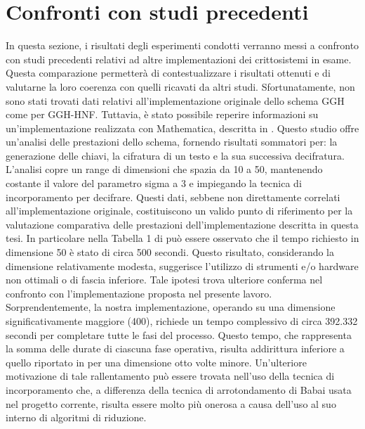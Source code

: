 \section{Confronti con studi precedenti}

In questa sezione, i risultati degli esperimenti condotti verranno messi a confronto 
con studi precedenti relativi ad altre implementazioni dei crittosistemi in esame. 
Questa comparazione permetterà di 
contestualizzare i risultati ottenuti e di valutarne la loro coerenza con quelli ricavati
da altri studi. 
Sfortunatamente, non sono stati trovati dati relativi all'implementazione originale dello schema 
GGH come per GGH-HNF. Tuttavia, è stato possibile reperire informazioni su un'implementazione realizzata 
con Mathematica, descritta in \cite{GGH16}. Questo studio offre un'analisi delle prestazioni 
dello schema, fornendo risultati sommatori per: la generazione delle chiavi, la cifratura 
di un testo e la sua successiva decifratura. L'analisi copre un range di dimensioni che 
spazia da 10 a 50, mantenendo costante il valore del parametro sigma a 3 e 
impiegando la tecnica di incorporamento per decifrare. Questi dati, sebbene non direttamente correlati 
all'implementazione originale, costituiscono un valido punto di riferimento per la valutazione 
comparativa delle prestazioni dell'implementazione descritta in questa tesi. In particolare 
nella Tabella 1 di \cite[Sezione 6]{GGH16} può essere osservato che il tempo richiesto 
in dimensione 50 è stato di circa 500 secondi. 
Questo risultato, considerando la dimensione relativamente modesta, suggerisce l'utilizzo 
di strumenti e/o hardware non ottimali o di fascia inferiore. Tale ipotesi trova ulteriore conferma nel confronto con l'implementazione 
proposta nel presente lavoro. Sorprendentemente, la nostra implementazione, operando su 
una dimensione significativamente maggiore (400), richiede un tempo complessivo di circa 
392.332 secondi per completare tutte le fasi del processo. Questo tempo, che rappresenta 
la somma delle durate di ciascuna fase operativa, risulta addirittura inferiore a quello 
riportato in \cite{GGH16} per una dimensione otto volte minore. Un'ulteriore motivazione di tale 
rallentamento può essere trovata nell'uso della tecnica di incorporamento che, a differenza 
della tecnica di arrotondamento di Babai usata nel progetto corrente, risulta essere molto più
onerosa a causa dell'uso al suo interno di algoritmi di riduzione.  

